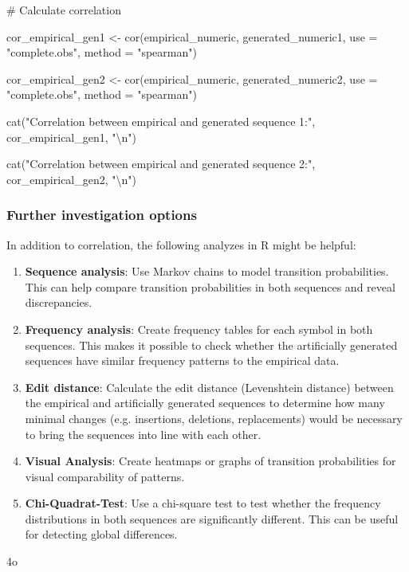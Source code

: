 \documentclass[
]{article}
\begin{document}
\# Calculate correlation

cor\_empirical\_gen1 \textless- cor(empirical\_numeric,
generated\_numeric1, use = "complete.obs", method = "spearman")

cor\_empirical\_gen2 \textless- cor(empirical\_numeric,
generated\_numeric2, use = "complete.obs", method = "spearman")

cat("Correlation between empirical and generated sequence 1:",
cor\_empirical\_gen1, "\textbackslash n")

cat("Correlation between empirical and generated sequence 2:",
cor\_empirical\_gen2, "\textbackslash n")

\subsubsection{\texorpdfstring{\textbf{Further investigation
options}}{Further investigation options}}\label{further-investigation-options}

In addition to correlation, the following analyzes in R might be
helpful:

\begin{enumerate}
\def\labelenumi{\arabic{enumi}.}
\item
  \textbf{Sequence analysis}: Use Markov chains to model transition
  probabilities. This can help compare transition probabilities in both
  sequences and reveal discrepancies.
\item
  \textbf{Frequency analysis}: Create frequency tables for each symbol
  in both sequences. This makes it possible to check whether the
  artificially generated sequences have similar frequency patterns to
  the empirical data.
\item
  \textbf{Edit distance}: Calculate the edit distance (Levenshtein
  distance) between the empirical and artificially generated sequences
  to determine how many minimal changes (e.g. insertions, deletions,
  replacements) would be necessary to bring the sequences into line with
  each other.
\item
  \textbf{Visual Analysis}: Create heatmaps or graphs of transition
  probabilities for visual comparability of patterns.
\item
  \textbf{Chi-Quadrat-Test}: Use a chi-square test to test whether the
  frequency distributions in both sequences are significantly different.
  This can be useful for detecting global differences.
\end{enumerate}

4o
\end{document}
